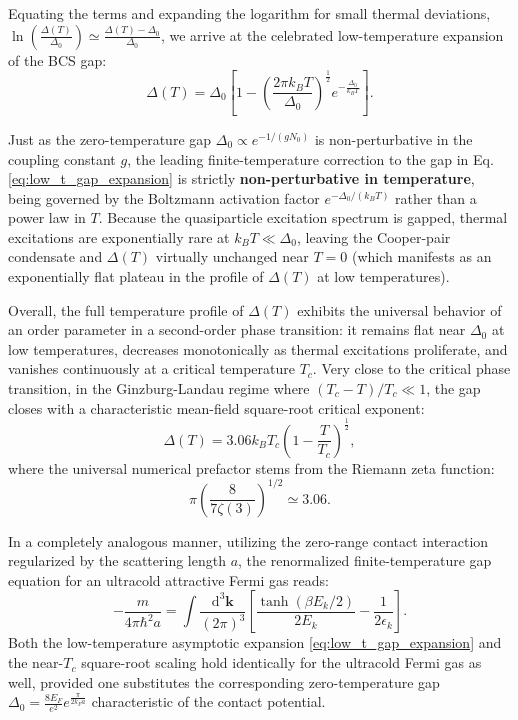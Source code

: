 Equating the terms and expanding the logarithm for small thermal deviations, \( \ln\left(\frac{\Delta(T)}{\Delta_0}\right) \simeq \frac{\Delta(T) - \Delta_0}{\Delta_0} \), we arrive at the celebrated low-temperature expansion of the BCS gap:
\begin{equation} \label{eq:low_t_gap_expansion}
    \Delta(T) = \Delta_0 \left[ 1 - \left(\frac{2\pi k_B T}{\Delta_0}\right)^{\frac{1}{2}} e^{-\frac{\Delta_0}{k_B T}} \right].
\end{equation}

Just as the zero-temperature gap \( \Delta_0 \propto e^{-1/(gN_0)} \) is non-perturbative in the coupling constant \( g \), the leading finite-temperature correction to the gap in Eq. \eqref{eq:low_t_gap_expansion} is strictly \textbf{non-perturbative in temperature}, being governed by the Boltzmann activation factor \( e^{-\Delta_0 / (k_B T)} \) rather than a power law in \( T \). Because the quasiparticle excitation spectrum is gapped, thermal excitations are exponentially rare at \( k_B T \ll \Delta_0 \), leaving the Cooper-pair condensate and \( \Delta(T) \) virtually unchanged near \( T = 0 \) (which manifests as an exponentially flat plateau in the profile of \( \Delta(T) \) at low temperatures).


Overall, the full temperature profile of \( \Delta(T) \) exhibits the universal behavior of an order parameter in a second-order phase transition: it remains flat near \( \Delta_0 \) at low temperatures, decreases monotonically as thermal excitations proliferate, and vanishes continuously at a critical temperature \( T_c \). Very close to the critical phase transition, in the Ginzburg-Landau regime where \( (T_c - T)/T_c \ll 1 \), the gap closes with a characteristic mean-field square-root critical exponent:
\[
    \Delta(T) = 3.06 k_B T_c \left(1 - \frac{T}{T_c}\right)^{\frac{1}{2}},
\]
where the universal numerical prefactor stems from the Riemann zeta function:
\[
    \pi \left( \frac{8}{7\zeta(3)} \right)^{1/2} \simeq 3.06.
\]

In a completely analogous manner, utilizing the zero-range contact interaction regularized by the scattering length \( a \), the renormalized finite-temperature gap equation for an ultracold attractive Fermi gas reads:
\begin{equation} \label{eq:ultracold_finite_t_gap}
    -\frac{m}{4\pi\hbar^2 a} = \int \frac{\mathrm{d}^3\mathbf{k}}{(2\pi)^3} \left[ \frac{\tanh(\beta E_k / 2)}{2E_k} - \frac{1}{2\epsilon_k} \right].
\end{equation}
Both the low-temperature asymptotic expansion \eqref{eq:low_t_gap_expansion} and the near-\( T_c \) square-root scaling hold identically for the ultracold Fermi gas as well, provided one substitutes the corresponding zero-temperature gap \( \Delta_0 = \frac{8E_F}{e^2} e^{\frac{\pi}{2k_F a}} \) characteristic of the contact potential.


